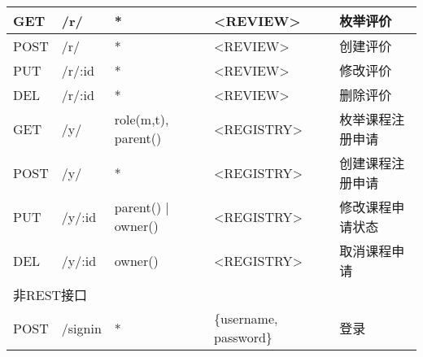 \begin{longtable}{|p{1.2cm}|p{3cm}|p{3cm}|p{4cm}|X|}
  GET  & /r/    & * & <REVIEW> & 枚举评价 \\ \hline
  POST & /r/    & * & <REVIEW> & 创建评价 \\ \hline
  PUT  & /r/:id & * & <REVIEW> & 修改评价 \\ \hline
  DEL  & /r/:id & * & <REVIEW> & 删除评价 \\ \hline

  GET  & /y/    & role(m,t), parent()& <REGISTRY> & 枚举课程注册申请 \\ \hline
  POST & /y/    & *                  & <REGISTRY> & 创建课程注册申请 \\ \hline
  PUT  & /y/:id & parent() | owner() & <REGISTRY> & 修改课程申请状态 \\ \hline
  DEL  & /y/:id & owner()            & <REGISTRY> & 取消课程申请     \\ \hline

  \multicolumn{5}{|l|}{非REST接口} \\ \hline
  POST    & /signin                      & *             & \{username, password\} & 登录 \\ \hline

\end{longtable}


